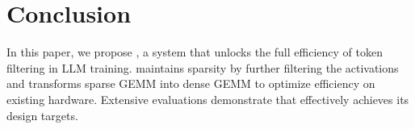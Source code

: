 \section{Conclusion}

In this paper, we propose \solution, a system that unlocks the full efficiency of token filtering in LLM training. \solution maintains sparsity by further filtering the activations and transforms sparse GEMM into dense GEMM to optimize efficiency on existing hardware. Extensive evaluations demonstrate that \solution effectively achieves its design targets.